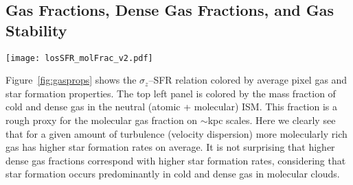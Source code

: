 \documentclass[usletter,fleqn,usenatbib]{mnras}
\begin{document}
\subsection{Gas Fractions, Dense Gas Fractions, and Gas Stability}\label{sec:fractions}
\begin{figure*}
	\centering
	\texttt{[image: losSFR\_molFrac\_v2.pdf]}
	\caption{Distribution of $\sigma_z$ and SFR (as Fig.~\ref{fig:tracers}, grey contours show 75, 95\% data inclusion regions) colored by various gas and star formation properties.
	\textbf{Top Left:} Cold and dense gas fraction ($f_{\rm C\&D} = \Sigma_{\rm C\&D}/\Sigma_{\rm gas}$ in pixels). C\&D gas fraction rises as SFR increases at constant velocity dispersion. 
	\textbf{Top Right:} Gas fraction  ($f_{\rm gas} = \Sigma_{\rm gas}/(\Sigma_{\rm gas}+\Sigma_\star)$ in pixels). As $\Sigma_{\rm SFR}$ scales with $\Sigma_{\rm gas}$, at fixed $\Sigma_{\rm SFR}$ lower $f_{\rm gas}$ is driven by higher $\Sigma_\star$ and $\Sigma_{\rm tot}$
	Gas-rich regions have the lowest velocity dispersions for their SFRs. For a constant amount of gas/star formation, gas in a deeper potential (higher stellar surface densities) must have larger velocity dispersions to maintain stability/equilibrium.  
	\textbf{Bottom Left:} Turbulent Toomre-Q parameter $\tilde Q_{\rm gas}$ (Eq.~\ref{eq:Q}).  Orange line denotes $\tilde Q_{\rm gas} = 1$ threshold for instabilities (i.e., pixels in this region of $\Sigma_{\rm SFR}^{\rm 10 \, Myr}-\sigma_z$ space are on-average unstable).  Less stable gas (at fixed $\sigma_z$) produces higher 10 Myr average star formation rates.
	\textbf{Bottom Right:} Star formation ``burstiness'', $\eta_{\rm burst}$.  Regions with low ratios of past to current SFRs have low $\sigma_z$ at constant 10 Myr-averaged SFR, corresponding with regions of $\tilde Q_{\rm gas} \lesssim 1$.}
	\label{fig:gasprops}
\end{figure*}
Figure~\ref{fig:gasprops} shows the $\sigma_z$--SFR relation colored by average pixel gas and star formation properties.  The top left panel is colored by the mass fraction of cold and dense gas in the neutral (atomic + molecular) ISM.  This fraction is a rough proxy for the molecular gas fraction on $\sim$kpc scales.  Here we clearly see that for a given amount of turbulence (velocity dispersion) more molecularly rich gas has higher star formation rates on average.  It is not surprising that higher dense gas fractions correspond with higher star formation rates, considering that star formation occurs predominantly in cold and dense gas in molecular clouds.
\end{document}
